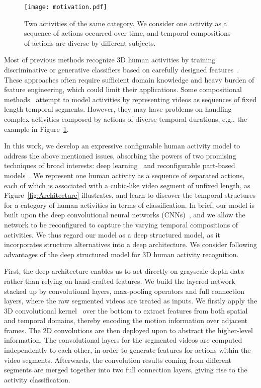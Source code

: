 \documentclass{sig-alternate}
\begin{document}
\begin{figure}[!htb]
\centering
\texttt{[image: motivation.pdf]}
\caption{Two activities of the same category. We consider one activity as a sequence of actions occurred over time, and temporal compositions of actions are diverse by different subjects.}\label{fig:motivation}
\end{figure}

Most of previous methods recognize 3D human activities by training discriminative or generative classifiers based on carefully designed features~\cite{HOJ3D,HON4D,DSTIP,WuYingCVPR2012}. These approaches often require sufficient domain knowledge and heavy burden of feature engineering, which could limit their applications. Some compositional methods~\cite{WangPAMI2011,CIVU2013survey} attempt to model activities by representing videos as sequences of fixed length temporal segments. However, they may have problems on handling complex activities composed by actions of diverse temporal durations, e.g., the example in  Figure~\ref{fig:motivation}.


In this work, we develop an expressive configurable human activity model to address the above mentioned issues, absorbing the powers of two promising techniques of broad interests: deep learning~\cite{CNN1990,Hinton06,ImagenetNIPS2012,3DCNNPAMI, MDLACM13, PPDDNN13,AOGCVPR2013} and reconfigurable part-based models~\cite{AOGZhu2006, SinisaSPNCVPR2012, AOGICCV2011,LinGrammar}. We represent one human activity as a sequence of separated actions, each of which is associated with a cubic-like video segment of unfixed length, as Figure~\ref{fig:Architecture} illustrates, and learn to discover the temporal structures for a category of human activities in terms of classification. In brief, our model is built upon the deep convolutional neural networks (CNNs)~\cite{CNN1990,3DCNNPAMI}, and we allow the network to be reconfigured to capture the varying temporal compositions of activities.  We thus regard our model as a deep structured model, as it incorporates structure alternatives into a deep architecture. We consider following advantages of the deep structured model for 3D human activity recognition.

First, the deep architecture enables us to act directly on grayscale-depth data rather than relying on hand-crafted features. We build the layered network stacked up by convolutional layers, max-pooling operators and full connection layers, where the raw segmented videos are treated as inputs. We firstly apply the 3D convolutional kernel~\cite{3DCNNPAMI} over the bottom to extract features from both spatial and temporal domains, thereby encoding the motion information over adjacent frames. The 2D convolutions are then deployed upon to abstract the higher-level information. The convolutional layers for the segmented videos are computed independently to each other, in order to generate features for actions within the video segments. Afterwards, the convolution results coming from different segments are merged together into two full connection layers, giving rise to the activity classification.
\end{document}
